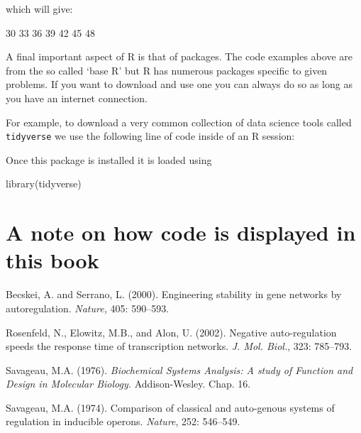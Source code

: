 which will give:

\begin{Rout}
30
33
36
39
42
45
48
\end{Rout}

A final important aspect of R is that of packages. The code examples above
are from the so called `base R' but R has numerous packages
specific to given problems. If you want to download and use one you can always
do so as long as you have an internet connection.

For example, to download a very common collection of data science tools called
\texttt{tidyverse}
we use the following line of code inside of an R session:

\begin{Rin}
install.packages{"tidyverse")
\end{Rin}

Once this package is installed it is loaded using

\begin{Rin}
library(tidyverse)
\end{Rin}

\section{A note on how code is displayed in this
book}\label{sec:a-note-on-how-code-is-displayed-in-this-book}


\begin{thefurtherreading}{99}  %

\bibitem{} Becskei, A. and Serrano, L. (2000). Engineering stability in gene
networks by autoregulation. \textit{Nature, }405: 590--593.

\bibitem{} Rosenfeld, N., Elowitz, M.B., and Alon, U. (2002). Negative
auto-regulation speeds the response time of transcription networks. \textit{J.
Mol. Biol.}, 323: 785--793.

\bibitem{} Savageau, M.A. (1976). \textit{Biochemical Systems Analysis: A study
of Function and Design in Molecular Biology. }Addison-Wesley. Chap. 16.

\bibitem{} Savageau, M.A. (1974). Comparison of classical and auto-genous
systems of regulation in inducible operons. \textit{Nature}, 252: 546--549.
\end{thefurtherreading}
